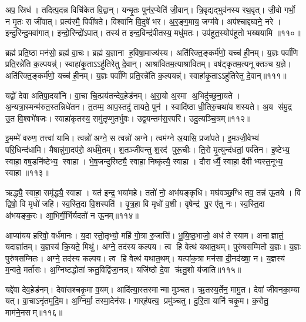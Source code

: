 अप॒ स्रिध॑। तदित्प॒दन्न विचि॑केत वि॒द्वान्। यन्मृ॒तः पुन॑र॒प्येति॑ जी॒वान्। त्रि॒वृद्यद्भुव॑नस्य रथ॒वृत्। जी॒वो गर्भो॒ न मृ॒तः स जी॑वात्। प्रत्य॑स्मै॒ पिपी॑षते। विश्वा॑नि वि॒दुषे॑ भर। अ॒र॒ङ्ग॒माय॒ जग्म॑वे। अप॑श्चाद्दघ्वने॒ नरे। इन्दु॒रिन्दु॒मवा॑गात्। इन्दो॒रिन्द्रो॑ऽपात्। तस्य॑ त इन्द॒विन्द्र॑पीतस्य॒ मधु॑मतः। उप॑हूत॒स्योप॑हूतो भख्षयामि ॥११०॥\anuvakamend[उ॒द॒र्॒ष इ॑न्द्रि॒येण॒ गा म॒तिर॑र॒पा अ॑गा॒त्रीणि॑ च]

ब्रह्म॑ प्रति॒ष्ठा मन॑सो॒ ब्रह्म॑ वा॒चः। ब्रह्म॑ य॒ज्ञाना ह॒विषा॒माज्य॑स्य। अति॑रिक्त॒ङ्कर्म॑णो॒ यच्च॑ ही॒नम्। य॒ज्ञः पर्वा॑णि प्रति॒रन्ने॑ति क॒ल्पयन्न्॑। स्वाहा॑कृ॒ताऽऽहु॑तिरेतु दे॒वान्। आश्रा॑वितम॒त्याश्रा॑वितम्। वष॑ट्कृतम॒त्यनूक्तञ्च य॒ज्ञे। अति॑रिक्त॒ङ्कर्म॑णो॒ यच्च॑ ही॒नम्। य॒ज्ञः पर्वा॑णि प्रति॒रन्ने॑ति क॒ल्पयन्न्॑। स्वाहा॑कृ॒ताऽऽहु॑तिरेतु दे॒वान्॥१११॥

यद्वो॑ देवा अतिपा॒दया॑नि। वा॒चा चि॒त्प्रय॑तन्देव॒हेड॑नम्। अ॒रा॒यो अ॒स्मा अ॒भिदु॑च्छुना॒यते। अ॒न्यत्रा॒स्मन्म॑रुत॒स्तन्निधे॑तन। त॒तम्म॒ आप॒स्तदु॑ तायते॒ पुन॑। स्वादि॑ष्ठा धी॒तिरु॒चथा॑य शस्यते। अ॒य स॑मु॒द्र उ॒त वि॒श्वभे॑षजः। स्वाहा॑कृतस्य॒ समु॑तृप्णुतर्भुवः। उद्व॒यन्तम॑स॒स्परि॑। उदु॒त्यञ्चि॒त्रम्॥११२॥

इ॒मम्मे॑ वरुण॒ तत्त्वा॑ यामि। त्वन्नो॑ अग्ने॒ स त्वन्नो॑ अग्ने। त्वम॑ग्ने अ॒यासि॒ प्रजा॑पते। इ॒मञ्जी॒वेभ्य॑ परि॒धिन्द॑धामि। मैषान्नु॑गा॒दप॑रो॒ अर्ध॑मे॒तम्। श॒तञ्जी॑वन्तु श॒रद॑ पुरू॒चीः। ति॒रो मृ॒त्युन्द॑धतां॒ पर्व॑तेन। इ॒ष्टेभ्य॒ स्वाहा॒ वष॒डनि॑ष्टेभ्य॒ स्वाहा। भे॒ष॒जन्दुरि॑ष्ट्यै॒ स्वाहा॒ निष्कृ॑त्यै॒ स्वाहा। दौरार्ध्यै॒ स्वाहा॒ दैवीभ्यस्त॒नूभ्य॒ स्वाहा॥११३॥

ऋद्ध्यै॒ स्वाहा॒ समृ॑द्ध्यै॒ स्वाहा। यत॑ इन्द्र॒ भया॑महे। ततो॑ नो॒ अभ॑यङ्कृधि। मघ॑वञ्छ॒ग्धि तव॒ तन्न॑ ऊ॒तये। वि द्विषो॒ वि मृधो॑ जहि। स्व॒स्ति॒दा वि॒शस्पति॑। वृ॒त्र॒हा वि मृधो॑ व॒शी। वृषेन्द्र॑ पु॒र ए॑तु नः। स्व॒स्ति॒दा अ॑भयङ्क॒रः। आ॒भिर्गी॒र्भिर्यदतो॑ न ऊ॒नम्॥११४॥

आप्या॑यय हरिवो॒ वर्ध॑मानः। य॒दा स्तो॒तृभ्यो॒ महि॑ गो॒त्रा रु॒जासि॑। भू॒यि॒ष्ठ॒भाजो॒ अध॑ ते स्याम। अनाज्ञातं॒ यदाज्ञा॑तम्। य॒ज्ञस्य॑ क्रि॒यते॒ मिथु॑। अग्ने॒ तद॑स्य कल्पय। त्व हि वेत्थ॑ यथात॒थम्। पुरु॑षसम्मितो य॒ज्ञः। य॒ज्ञः पुरु॑षसम्मितः। अग्ने॒ तद॑स्य कल्पय। त्व हि वेत्थ॑ यथात॒थम्। यत्पा॑क॒त्रा मन॑सा दी॒नद॑ख्षा॒ न। य॒ज्ञस्य॑ म॒न्वते॒ मर्ता॑सः। अ॒ग्निष्टद्धोता॑ क्रतु॒विद्वि॑जा॒नन्न्। यजि॑ष्ठो दे॒वा ऋ॑तु॒शो य॑जाति॥११५॥\anuvakamend[दे॒वा श्चि॒त्रं त॒नूभ्य॒ स्वाहो॒नं पुरु॑षसम्मि॒तोऽग्ने॒ तद॑स्य कल्पय॒ पञ्च॑ च]

यद्दे॑वा देव॒हेड॑नम्। देवा॑सश्चकृ॒मा व॒यम्। आदि॑त्या॒स्तस्मान्मा मुञ्चत। ऋ॒तस्य॒र्तेन॒ मामु॒त। देवा॑ जीवनका॒म्या यत्। वा॒चाऽनृ॑तमूदि॒म। अ॒ग्निर्मा॒ तस्मा॒देन॑सः। गार्‌ह॑पत्य॒ प्रमु॑ञ्चतु। दु॒रि॒ता यानि॑ चकृ॒म। क॒रोतु॒ माम॑ने॒नसम्॥११६॥

